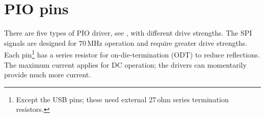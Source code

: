 \chapter{PIO pins}



There are five types of PIO driver, see , with
different drive strengths.  The SPI signals are designed for 70\,MHz
operation and require greater drive strengths.  Each
pin\footnote{Except the USB pins; these need external 27\,ohm series
  termination resistors.} has a series resistor for on-die-termination
(ODT) to reduce reflections.  The maximum current applies for DC
operation; the drivers can momentarily provide much more current.



